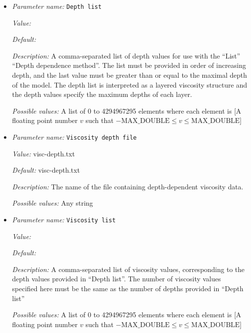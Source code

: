 \begin{itemize}
{\it Possible values:} Any one of Function, File, List, None
\item {\it Parameter name:} {\tt Depth list}
\label{parameters:Material model/Depth dependent model/Depth list}


{\it Value:} 


{\it Default:} 


{\it Description:} A comma-separated list of depth values for use with the ``List'' ``Depth dependence method''. The list must be provided in order of increasing depth, and the last value must be greater than or equal to the maximal depth of the model. The depth list is interpreted as a layered viscosity structure and the depth values specify the maximum depths of each layer. 


{\it Possible values:} A list of 0 to 4294967295 elements where each element is [A floating point number $v$ such that $-\text{MAX\_DOUBLE} \leq v \leq \text{MAX\_DOUBLE}$]
\item {\it Parameter name:} {\tt Viscosity depth file}
\label{parameters:Material model/Depth dependent model/Viscosity depth file}


{\it Value:} visc-depth.txt


{\it Default:} visc-depth.txt


{\it Description:} The name of the file containing depth-dependent viscosity data. 


{\it Possible values:} Any string
\item {\it Parameter name:} {\tt Viscosity list}
\label{parameters:Material model/Depth dependent model/Viscosity list}


{\it Value:} 


{\it Default:} 


{\it Description:} A comma-separated list of viscosity values, corresponding to the depth values provided in ``Depth list''. The number of viscosity values specified here must be the same as the number of depths provided in ``Depth list'' 


{\it Possible values:} A list of 0 to 4294967295 elements where each element is [A floating point number $v$ such that $-\text{MAX\_DOUBLE} \leq v \leq \text{MAX\_DOUBLE}$]
\end{itemize}



